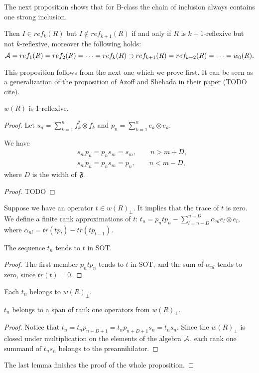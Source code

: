 \documentclass[12pt]{amsart}
\theoremstyle{case}
\begin{document}
  The next proposition shows that for B-class the chain of inclusion always contains one strong inclusion.
  \begin{prop}
    \label{prop:chain}
    Then $I \in ref_k(R)$ but $I \not\in ref_{k+1}(R)$ if and only if $R$ is $k + 1$-reflexive but not $k$-reflexive, moreover the
      following holds:
    \[
      \cal{A} = ref_1(R) = ref_2(R) = \dots = ref_k(R) \supset ref_{k + 1}(R) = ref_{k + 2}(R) = \dots = w_0(R).
    \]
  \end{prop}
  This proposition follows from the next one which we prove first.
  It can be seen as a generalization of the proposition of Azoff and Shehada in their paper (TODO cite).
  \begin{prop}
    $w(R)$ is 1-reflexive.
  \end{prop}
  \begin{proof}
    Let $s_n = \sum_{k=1}^n f^*_k \otimes f_k$ and $p_n = \sum_{k=1}^n e_k \otimes e_k$.
    \begin{lemma}
      We have 
      \begin{align*}
        &s_m p_n = p_n s_m = s_m, \qquad n > m + D,\\
        &s_m p_n = p_n s_m = p_n, \qquad n < m - D,
      \end{align*}
      where $D$ is the width of $\fsys$.
    \end{lemma}
    \begin{proof}
      TODO
    \end{proof}
    Suppose we have an operator $t \in w(R)_\perp$.
    It implies that the trace of $t$ is zero.
    We define a finite rank approximations of $t$:
    $t_n = p_n t p_n - \sum_{l = n - D}^{n + D} \alpha_{nl} e_l \otimes e_l,$
    where $\alpha_{nl} = tr(t p_l) - tr(t p_{l - 1})$.
    \begin{lemma}
      The sequence $t_n$ tends to $t$ in SOT.
    \end{lemma}
    \begin{proof}
      The first member $p_n t p_n$ tends to $t$ in SOT, and the sum of $\alpha_{nl}$ tends to zero,
        since $tr(t) = 0$.
    \end{proof}
    \begin{lemma}
      Each $t_n$ belongs to $w(R)_\perp$.
    \end{lemma}
    \begin{lemma}
     $t_n$ belongs to a span of rank one operators from $w(R)_\perp$.
    \end{lemma}
    \begin{proof}
      Notice that $t_n = t_n p_{n + D + 1} = t_n p_{n + D + 1} s_n = t_n s_n.$
      Since the $w(R)_\perp$ is closed under multiplication on the elements of the algebra $\cal{A}$,
        each rank one summand of $t_n s_n$ belongs to the preannihilator.
    \end{proof}
    The last lemma finishes the proof of the whole proposition.
  \end{proof}
\end{document}
